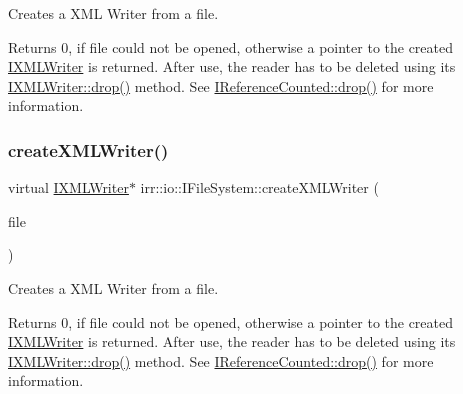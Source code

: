 Creates a X\+ML Writer from a file. 

\begin{DoxyReturn}{Returns}
0, if file could not be opened, otherwise a pointer to the created \hyperlink{classirr_1_1io_1_1IXMLWriter}{I\+X\+M\+L\+Writer} is returned. After use, the reader has to be deleted using its \hyperlink{classirr_1_1IReferenceCounted_a03856a09355b89d178090c4a5f738543}{I\+X\+M\+L\+Writer\+::drop()} method. See \hyperlink{classirr_1_1IReferenceCounted_a03856a09355b89d178090c4a5f738543}{I\+Reference\+Counted\+::drop()} for more information. 
\end{DoxyReturn}
\mbox{\label{classirr_1_1io_1_1IFileSystem_ac2bcaf8c338e80ff579061b7056c06da}} 
\subsubsection{\texorpdfstring{create\+X\+M\+L\+Writer()}{createXMLWriter()}\hspace{0.1cm}{\footnotesize\ttfamily [4/4]}}
{\footnotesize\ttfamily virtual \hyperlink{classirr_1_1io_1_1IXMLWriter}{I\+X\+M\+L\+Writer}$\ast$ irr\+::io\+::\+I\+File\+System\+::create\+X\+M\+L\+Writer (\begin{DoxyParamCaption}\item[{\hyperlink{classirr_1_1io_1_1IWriteFile}{I\+Write\+File} $\ast$}]{file }\end{DoxyParamCaption})\hspace{0.3cm}{\ttfamily [pure virtual]}}



Creates a X\+ML Writer from a file. 

\begin{DoxyReturn}{Returns}
0, if file could not be opened, otherwise a pointer to the created \hyperlink{classirr_1_1io_1_1IXMLWriter}{I\+X\+M\+L\+Writer} is returned. After use, the reader has to be deleted using its \hyperlink{classirr_1_1IReferenceCounted_a03856a09355b89d178090c4a5f738543}{I\+X\+M\+L\+Writer\+::drop()} method. See \hyperlink{classirr_1_1IReferenceCounted_a03856a09355b89d178090c4a5f738543}{I\+Reference\+Counted\+::drop()} for more information. 
\end{DoxyReturn}
\mbox{\label{classirr_1_1io_1_1IFileSystem_a1c5e98bc16e38b1d15b44e24b1b3bd32}} 
